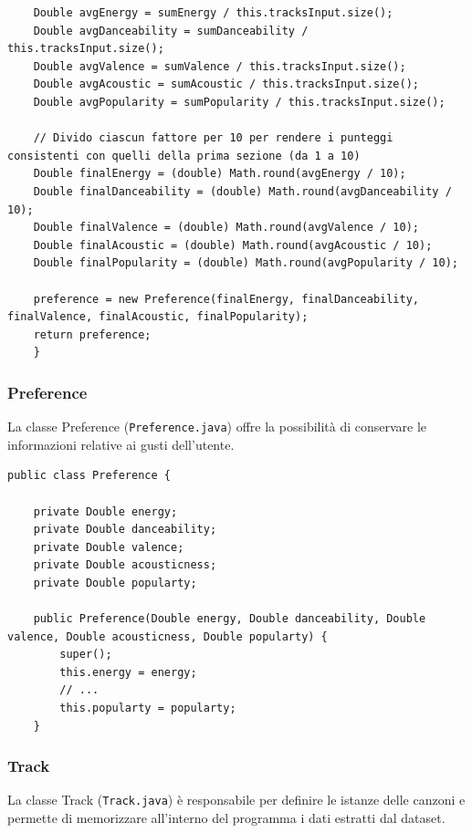 \documentclass[12pt, a4paper]{article}
\begin{document}
\begin{itemize}
\begin{lstlisting}
	Double avgEnergy = sumEnergy / this.tracksInput.size();
	Double avgDanceability = sumDanceability / this.tracksInput.size();
	Double avgValence = sumValence / this.tracksInput.size();
	Double avgAcoustic = sumAcoustic / this.tracksInput.size();
	Double avgPopularity = sumPopularity / this.tracksInput.size();

	// Divido ciascun fattore per 10 per rendere i punteggi consistenti con quelli della prima sezione (da 1 a 10)
	Double finalEnergy = (double) Math.round(avgEnergy / 10);
	Double finalDanceability = (double) Math.round(avgDanceability / 10);
	Double finalValence = (double) Math.round(avgValence / 10);
	Double finalAcoustic = (double) Math.round(avgAcoustic / 10);
	Double finalPopularity = (double) Math.round(avgPopularity / 10);

	preference = new Preference(finalEnergy, finalDanceability, finalValence, finalAcoustic, finalPopularity);
	return preference;
	}
\end{lstlisting}
\newpage
\end{itemize}

\subsubsection{Preference}

La classe Preference (\texttt{Preference.java}) offre la possibilità di conservare le informazioni relative ai gusti dell'utente.

\begin{lstlisting}
public class Preference {
	
	private Double energy;
	private Double danceability;
	private Double valence;
	private Double acousticness;
	private Double popularty;
	
	public Preference(Double energy, Double danceability, Double valence, Double acousticness, Double popularty) {
		super();
		this.energy = energy;
		// ...
		this.popularty = popularty;
	}
\end{lstlisting}

\subsubsection{Track}

La classe Track (\texttt{Track.java}) è responsabile per definire le istanze delle canzoni e permette di memorizzare all'interno del programma i dati estratti dal dataset.
\end{document}
